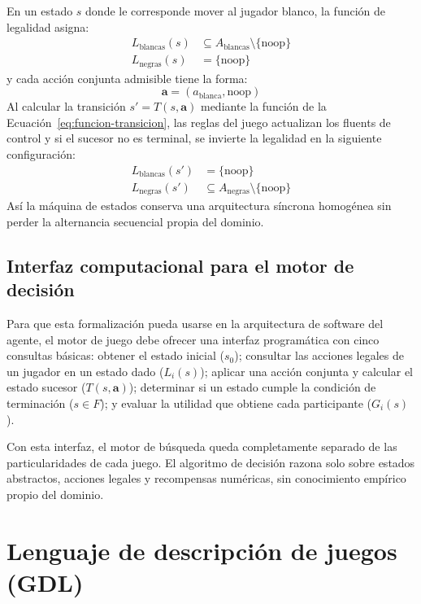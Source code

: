En un estado $s$ donde le corresponde mover al jugador blanco, la función de legalidad asigna:
\begin{align}
    L_{\text{blancas}}(s) &\subseteq A_{\text{blancas}} \setminus \{\text{noop}\} \label{eq:legalidad-turno-blancas} \\
    L_{\text{negras}}(s) &= \{\text{noop}\} \label{eq:legalidad-turno-negras}
\end{align}
y cada acción conjunta admisible tiene la forma:
\begin{equation}
    \mathbf{a} = (a_{\text{blanca}}, \text{noop})
    \label{eq:accion-turno-blancas}
\end{equation}
Al calcular la transición $s' = T(s, \mathbf{a})$ mediante la función de la Ecuación~\eqref{eq:funcion-transicion}, las reglas del juego actualizan los fluents de control y si el sucesor no es terminal, se invierte la legalidad en la siguiente configuración:
\begin{align}
    L_{\text{blancas}}(s') &= \{\text{noop}\} \label{eq:legalidad-siguiente-blancas} \\
    L_{\text{negras}}(s') &\subseteq A_{\text{negras}} \setminus \{\text{noop}\} \label{eq:legalidad-siguiente-negras}
\end{align}
Así la máquina de estados conserva una arquitectura síncrona homogénea sin perder la alternancia secuencial propia del dominio.

\subsection{Interfaz computacional para el motor de decisión}
\label{subsec:interfaz_motor}

Para que esta formalización pueda usarse en la arquitectura de software del agente, el motor de juego debe ofrecer una interfaz programática con cinco consultas básicas: obtener el estado inicial ($s_0$); consultar las acciones legales de un jugador en un estado dado ($L_i(s)$); aplicar una acción conjunta y calcular el estado sucesor ($T(s, \mathbf{a})$); determinar si un estado cumple la condición de terminación ($s \in F$); y evaluar la utilidad que obtiene cada participante ($G_i(s)$).

Con esta interfaz, el motor de búsqueda queda completamente separado de las particularidades de cada juego. El algoritmo de decisión razona solo sobre estados abstractos, acciones legales y recompensas numéricas, sin conocimiento empírico propio del dominio.

\section{Lenguaje de descripción de juegos (GDL)}
\label{sec:lenguajes_descripcion_juegos}

